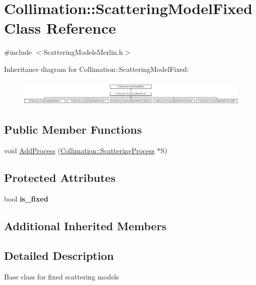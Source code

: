 \hypertarget{classCollimation_1_1ScatteringModelFixed}{}\section{Collimation\+:\+:Scattering\+Model\+Fixed Class Reference}
\label{classCollimation_1_1ScatteringModelFixed}


{\ttfamily \#include $<$Scattering\+Models\+Merlin.\+h$>$}

Inheritance diagram for Collimation\+:\+:Scattering\+Model\+Fixed\+:\begin{figure}[H]
\begin{center}
\leavevmode
\includegraphics[height=1.267925cm]{classCollimation_1_1ScatteringModelFixed}
\end{center}
\end{figure}
\subsection*{Public Member Functions}
\begin{DoxyCompactItemize}
\item 
void \hyperlink{classCollimation_1_1ScatteringModelFixed_a856fcbc7bc8e50339c7ba6b0d121fadd}{Add\+Process} (\hyperlink{classCollimation_1_1ScatteringProcess}{Collimation\+::\+Scattering\+Process} $\ast$S)
\end{DoxyCompactItemize}
\subsection*{Protected Attributes}
\begin{DoxyCompactItemize}
\item 
\mbox{\label{classCollimation_1_1ScatteringModelFixed_a3cfb01b3c3404b825e3311ef7e112a4a}} 
bool {\bfseries is\+\_\+fixed}
\end{DoxyCompactItemize}
\subsection*{Additional Inherited Members}


\subsection{Detailed Description}
Base class for fixed scattering models

